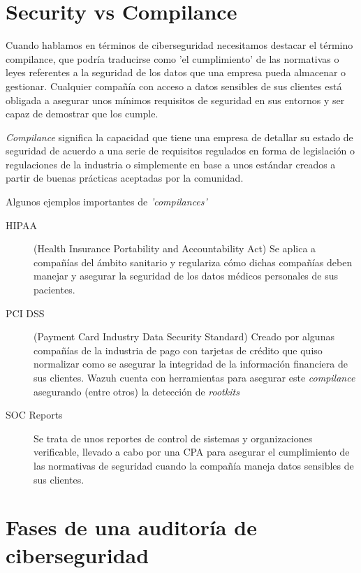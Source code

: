 \section{Security vs Compilance}

Cuando hablamos en términos de ciberseguridad necesitamos destacar el término \Gls{compilance}, que podría traducirse como 'el cumplimiento' de las normativas o leyes referentes a la seguridad de los datos que una empresa pueda almacenar o gestionar. Cualquier compañía con acceso a datos sensibles de sus clientes está obligada a asegurar unos mínimos requisitos de seguridad en sus entornos y ser capaz de demostrar que los cumple. \cite{phoenixnap}

\textit{Compilance} significa la capacidad que tiene una empresa de detallar su estado de seguridad de acuerdo a una serie de requisitos regulados en forma de legislación o regulaciones de la industria o simplemente en base a unos estándar creados a partir de buenas prácticas aceptadas por la comunidad.

Algunos ejemplos importantes de \textit{'compilances'}

\begin{description}
\item[HIPAA](Health Insurance Portability and Accountability Act) Se aplica a compañías del ámbito sanitario y regulariza cómo dichas compañías deben manejar y asegurar la seguridad de los datos médicos personales de sus pacientes. 

\item[PCI DSS] (Payment Card Industry Data Security Standard) Creado por algunas compañías de la industria de pago con tarjetas de crédito que quiso normalizar como se asegurar la integridad de la información financiera de sus clientes. Wazuh \cite{wazuh-pci} cuenta con herramientas para asegurar este \textit{compilance} asegurando (entre otros) la detección de \textit{rootkits} 

\item[SOC Reports] Se trata de unos reportes de control de sistemas y organizaciones verificable, llevado a cabo por una \acrfull{CPA} para asegurar el cumplimiento de las normativas de seguridad cuando la compañía maneja datos sensibles de sus clientes.

\end{description}

\section{Fases de una auditoría de ciberseguridad}

